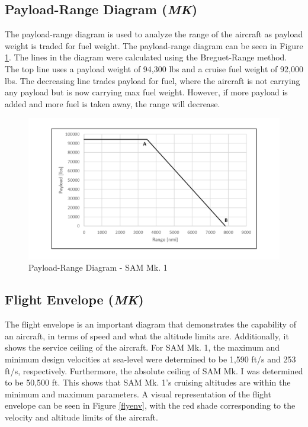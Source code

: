 \subsection{Payload-Range Diagram (\textit{MK})}
The payload-range diagram is used to analyze the range of the aircraft as payload weight is traded for fuel weight. The payload-range diagram can be seen in Figure \ref{payrang}. The lines in the diagram were calculated using the Breguet-Range method. The top line uses a payload weight of 94,300 lbs and a cruise fuel weight of 92,000 lbs. The decreasing line trades payload for fuel, where the aircraft is not carrying any payload but is now carrying max fuel weight. However, if more payload is added and more fuel is taken away, the range will decrease. 

\begin{figure}[!h]
    \centering
    \includegraphics[width=1.0\textwidth]{Photos/Payload_Range.pdf}
    \caption{Payload-Range Diagram -  SAM Mk. 1}
    \label{payrang}
 \end{figure}

\subsection{Flight Envelope (\textit{MK})}
The flight envelope is an important diagram that demonstrates the capability of an aircraft, in terms of speed and what the altitude limits are. Additionally, it shows the service ceiling of the aircraft. For SAM Mk. 1, the maximum and minimum design velocities at sea-level were determined to be 1,590 ft/s and 253 ft/s, respectively. Furthermore, the absolute ceiling of SAM Mk. I was determined to be 50,500 ft. This shows that SAM Mk. 1's cruising altitudes are within the minimum and maximum parameters. A visual representation of the flight envelope can be seen in Figure \ref{flyenv}, with the red shade corresponding to the velocity and altitude limits of the aircraft. 

